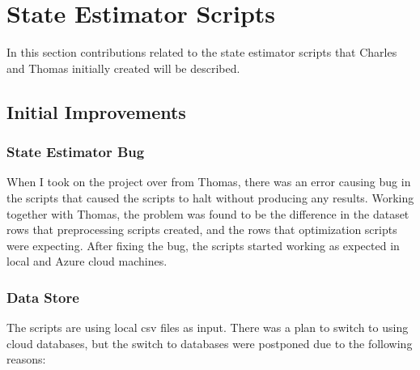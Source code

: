 \documentclass[12pt,twoside]{report}
\begin{document}
\section{State Estimator Scripts}
In this section contributions related to the state estimator scripts that Charles and Thomas initially created will be described.

\subsection{Initial Improvements}

\subsubsection{State Estimator Bug}
When I took on the project over from Thomas, there was an error causing bug in the scripts that caused the scripts to halt without producing any results. Working together with Thomas, the problem was found to be the difference in the dataset rows that preprocessing scripts created, and the rows that optimization scripts were expecting. After fixing the bug, the scripts started working as expected in local and Azure cloud machines.

\subsubsection{Data Store}
The scripts are using local csv files as input. There was a plan to switch to using cloud databases, but the switch to databases were postponed due to the following reasons:
\end{document}
